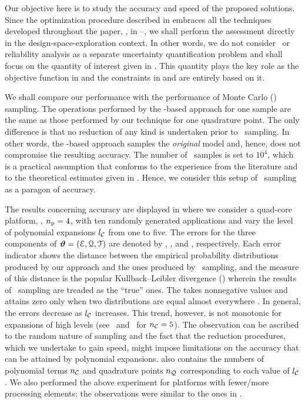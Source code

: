 Our objective here is to study the accuracy and speed of the proposed solutions.
Since the optimization procedure described in  embraces all the techniques developed throughout the paper, \ie, in --, we shall perform the assessment directly in the design-space-exploration context.
In other words, we do not consider \ta\ or reliability analysis as a separate uncertainty quantification problem and shall focus on the quantity of interest given in .
This quantity plays the key role as the objective function in  and the constraints in  and  are entirely based on it.

We shall compare our performance with the performance of Monte Carlo (\MC) sampling.
The operations performed by the \MC-based approach for one sample are the same as those performed by our technique for one quadrature point.
The only difference is that no reduction of any kind is undertaken prior to \MC\ sampling.
In other words, the \MC-based approach samples the \emph{original} model and, hence, does not compromise the resulting accuracy.
The number of \MC\ samples is set to $10^4$, which is a practical assumption that conforms to the experience from the literature \cite{ukhov2014, lee2013, juan2012, xiang2010} and to the theoretical estimates given in \cite{diaz-emparanza2002}.
Hence, we consider this setup of \MC\ sampling as a paragon of accuracy.


The results concerning accuracy are displayed in  where we consider a quad-core platform, \ie, ${n_\text{p}} = 4$, with ten randomly generated applications and vary the level of polynomial expansions ${l_\mathcal{C}}$ from one to five.
The errors for the three components of $\bm{\vartheta} = (\EuScript{E}, \EuScript{Q}, \EuScript{T})$ are denoted by \errorE, \errorQ, and \errorT, respectively.
Each error indicator shows the distance between the empirical probability distributions produced by our approach and the ones produced by \MC\ sampling, and the measure of this distance is the popular Kullback--Leibler divergence () wherein the results of \MC\ sampling are treaded as the ``true'' ones.
The  takes nonnegative values and attains zero only when two distributions are equal almost everywhere \cite{durrett2010}.
In general, the errors decrease as ${l_\mathcal{C}}$ increases.
This trend, however, is not monotonic for expansions of high levels (see \errorQ\ and \errorT\ for ${n_\mathcal{C}} = 5$).
The observation can be ascribed to the random nature of sampling and the fact that the reduction procedures, which we undertake to gain speed, might impose limitations on the accuracy that can be attained by polynomial expansions.
 also contains the numbers of polynomial terms ${n_\mathcal{C}}$ and quadrature points ${n_\mathcal{Q}}$ corresponding to each value of ${l_\mathcal{C}}$.
We also performed the above experiment for platforms with fewer/more processing elements; the observations were similar to the ones in .

